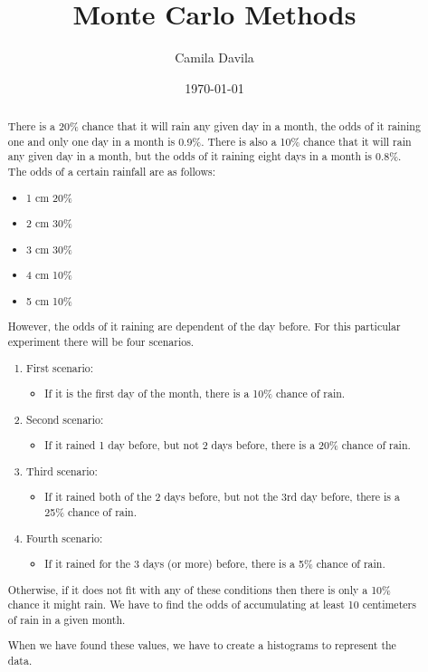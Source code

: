\documentclass[twocolumn]{revtex4}
\begin{document}
\title{
Monte Carlo Methods
}

\author{Camila Davila}


\date{\today}

\begin{abstract}
 There is a 20\%  chance that it will rain any given day in a month, the odds of it raining one and only one day in a month is 0.9\%. There is also a 10\% chance that it will rain any given day in a month, but the odds of it raining eight days in a month is 0.8\%. The odds of a certain rainfall are as follows: 
 \begin{itemize}
 \item 1 cm 20\% 
 \item 2 cm 30\% 
 \item 3 cm 30\%
 \item 4 cm 10\%
 \item 5 cm 10\%
 
 \end{itemize}
 
 However, the odds of it raining are dependent of the day before. For this particular experiment there will be four scenarios. 
 \begin{enumerate}
 \item First scenario:
 	\begin{itemize}
	\item If it is the first day of the month, there is a 10\% chance of rain.
	\end{itemize}
 
 \item Second scenario:
 	\begin{itemize}
	\item If it rained 1 day before, but not 2 days before, there is a 20\% chance of rain. 
	\end{itemize}

  
  \item Third scenario:
 	\begin{itemize}
	\item If it rained both of the 2 days before, but not the 3rd day before, there is a 25\% chance of rain.
	\end{itemize}
  
  
   \item Fourth scenario:
 	\begin{itemize}
	\item If it rained for the 3 days (or more) before, there is a 5\% chance of rain. 
	\end{itemize}
  
  
 \end{enumerate}
 
 Otherwise, if it does not fit with any of these conditions then there is only a 10\% chance it might rain. 
 We have to find the odds of accumulating at least 10 centimeters of rain in a given month. 
 
 When we have found these values, we have to create a histograms to represent the data.
 
    \end{abstract}
\end{document}
